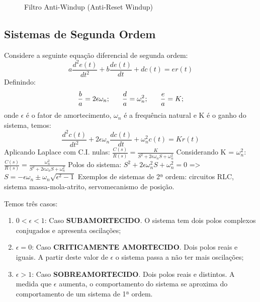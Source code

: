 \begin{enumerate}
\begin{enumerate}
\begin{figure}[h]
                            \caption{Filtro Anti-Windup (Anti-Reset Windup)}
                            \label{fig:filtro_anti_windup}
                        \end{figure}
        \end{enumerate}
\end{enumerate}
\newpage

\subsection{Sistemas de Segunda Ordem}
\hspace{4ex}Considere a seguinte equação diferencial de segunda ordem:
    \[a\frac{d^2e(t)}{dt^2}+b\frac{de(t)}{dt}+dc(t)=er(t)\]
Definindo:
    \[\frac{b}{a}=2\epsilon\omega_n; \hspace{4ex} \frac{d}{a}=\omega^2_n; \hspace{4ex} \frac{e}{a}=K;\]
onde \(\epsilon\) é o fator de amortecimento, \(\omega_n\) é a frequência natural e K é o ganho do sistema, temos:
    \[\frac{d^2c(t)}{dt^2}+2\epsilon\omega_n\frac{dc(t)}{dt}+\omega_n^2c(t)=Kr(t)\]
Aplicando Laplace com C.I. nulas: 
    \(\frac{C(s)}{R(s)}=\frac{K}{S^2+2\epsilon\omega_nS+\omega_n^2}\) 
    \newline
    \newline
Considerando K = \(\omega_n^2\): \(\frac{C(s)}{R(s)}=\frac{\omega_n^2}{S^2+2\epsilon\omega_nS+\omega_n^2}\)
    \newline
    \newline
Polos do sistema: \(S^2+2\epsilon\omega_n^2S+\omega_n^2=0\) => \(S=-\epsilon\omega_n\pm\omega_n\sqrt{\epsilon^2 -1}\)
    \newline
    \newline
Exemplos de sistemas de 2ª ordem: circuitos RLC, sistema massa-mola-atrito, servomecanismo de posição.
    \newline

Temos três casos:
\begin{enumerate}
    \item \(0 < \epsilon < 1\): Caso \textbf{SUBAMORTECIDO}. O sistema tem dois polos complexos conjugados e apresenta oscilações;
    \item \(\epsilon = 0\): Caso \textbf{CRITICAMENTE AMORTECIDO}. Dois polos reais e iguais. A partir deste valor de \(\epsilon\) o sistema passa a não ter mais oscilações;
    \item \(\epsilon > 1\): Caso \textbf{SOBREAMORTECIDO}. Dois polos reais e distintos. A medida que \(\epsilon\) aumenta, o comportamento do sistema se aproxima do comportamento de um sistema de 1ª ordem.
\end{enumerate}


